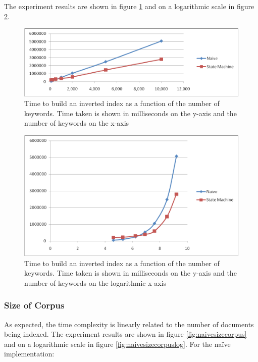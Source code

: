 \documentclass[10pt]{report}
\begin{document}
The experiment results are shown in figure \ref{fig:naivenumkeywords}
and on a logarithmic scale in figure \ref{fig:naivenumkeywordslog}.

\begin{figure}[p]
  \begin{center}
    \includegraphics[width=\textwidth,height=!]{naivenumkeywords}
  \end{center}
  \caption{Time to build an inverted index as a function of the
      number of keywords. Time taken is shown in milliseconds on the
      y-axis and the number of keywords on the x-axis}
  \label{fig:naivenumkeywords}
\end{figure} 


\begin{figure}[p]
  \begin{center}
    \includegraphics[width=\textwidth,height=!]{naivenumkeywordslog}
  \end{center}
  \caption{Time to build an inverted index as a function of the
      number of keywords. Time taken is shown in milliseconds on the
      y-axis and the number of keywords on the logarithmic x-axis}
  \label{fig:naivenumkeywordslog}
\end{figure} 


\subsubsection{Size of Corpus}
As expected, the time complexity is linearly related to the number of
documents being indexed. The experiment results are shown in figure
\ref{fig:naivesizecorpus} and on a logarithmic scale in figure
\ref{fig:naivesizecorpuslog}. For the na\"{i}ve implementation:
\end{document}
